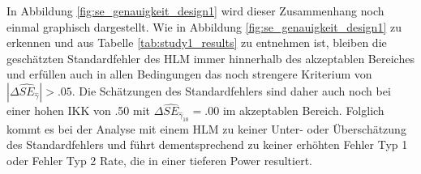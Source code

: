 \documentclass[12pt]{article}\usepackage[]{graphicx}\usepackage[]{color}
\begin{document}
In Abbildung \ref{fig:se_genauigkeit_design1} wird dieser Zusammenhang noch einmal graphisch dargestellt. Wie in Abbildung \ref{fig:se_genauigkeit_design1} zu erkennen und aus Tabelle \ref{tab:study1_results} zu entnehmen ist, bleiben die geschätzten Standardfehler des HLM immer hinnerhalb des akzeptablen Bereiches und erfüllen auch in allen Bedingungen das noch strengere Kriterium von $|\Delta\widehat{SE}_{\widehat{\gamma}}| > .05$. Die Schätzungen des Standardfehlers sind daher auch noch bei einer hohen IKK von .50 mit $\Delta\widehat{SE}_{\widehat{\gamma}_{10}} = .00$ im akzeptablen Bereich. Folglich kommt es bei der Analyse mit einem HLM zu keiner Unter- oder Überschätzung des Standardfehlers und führt dementsprechend zu keiner erhöhten Fehler Typ 1 oder Fehler Typ 2 Rate, die in einer tieferen Power resultiert.
\end{document}
